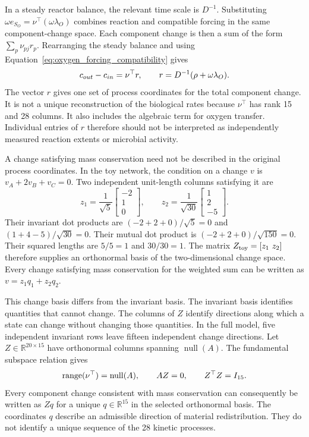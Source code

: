 In a steady reactor balance, the relevant time scale is $D^{-1}$. Substituting $\omega e_{S_O}=\nu^\top(\omega\lambda_O)$ combines reaction and compatible forcing in the same component-change space. Each component change is then a sum of the form $\sum_p\nu_{pj}r_p$. Rearranging the steady balance and using Equation~\eqref{eq:oxygen_forcing_compatibility} gives
\begin{equation}
\equationname{Reaction-progress coordinates for the effluent change}
c_{out}-c_{in}=\nu^\top r,\qquad
r=D^{-1}(\rho+\omega\lambda_O).
\label{eq:reaction_progress_coordinates}
\end{equation}
The vector $r$ gives one set of process coordinates for the total component change. It is not a unique reconstruction of the biological rates because $\nu^\top$ has rank 15 and 28 columns. It also includes the algebraic term for oxygen transfer. Individual entries of $r$ therefore should not be interpreted as independently measured reaction extents or microbial activity.

A change satisfying mass conservation need not be described in the original process coordinates. In the toy network, the condition on a change $v$ is $v_A+2v_B+v_C=0$. Two independent unit-length columns satisfying it are
\[
z_1=\frac1{\sqrt5}\begin{bmatrix}-2\\1\\0\end{bmatrix},\qquad
z_2=\frac1{\sqrt{30}}\begin{bmatrix}1\\2\\-5\end{bmatrix}.
\]
Their invariant dot products are $(-2+2+0)/\sqrt5=0$ and $(1+4-5)/\sqrt{30}=0$. Their mutual dot product is $(-2+2+0)/\sqrt{150}=0$. Their squared lengths are $5/5=1$ and $30/30=1$. The matrix $Z_{\rm toy}=[z_1\ z_2]$ therefore supplies an orthonormal basis of the two-dimensional change space. Every change satisfying mass conservation for the weighted sum can be written as $v=z_1q_1+z_2q_2$.

This change basis differs from the invariant basis. The invariant basis identifies quantities that cannot change. The columns of $Z$ identify directions along which a state can change without changing those quantities. In the full model, five independent invariant rows leave fifteen independent change directions. Let $Z\in\mathbb{R}^{20\times15}$ have orthonormal columns spanning $\operatorname{null}(A)$. The fundamental subspace relation gives
\begin{equation}
\equationname{Equivalent reaction and invariant-null spaces}
\operatorname{range}(\nu^\top)=\operatorname{null}(A),\qquad
AZ=0,\qquad Z^\top Z=I_{15}.
\label{eq:reaction_invariant_subspaces}
\end{equation}
Every component change consistent with mass conservation can consequently be written as $Zq$ for a unique $q\in\mathbb{R}^{15}$ in the selected orthonormal basis. The coordinates $q$ describe an admissible direction of material redistribution. They do not identify a unique sequence of the 28 kinetic processes.

